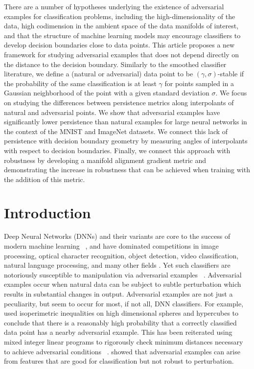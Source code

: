 
There are a number of hypotheses underlying the existence of
adversarial examples for classification problems, including the high-dimensionality of the data, high codimension in the ambient space of the data manifolds of interest, and that the structure of machine learning models may encourage classifiers to develop decision boundaries close to data points. 
This article proposes a new framework for studying adversarial examples that does not depend directly on the distance to the decision boundary. 
Similarly to the smoothed classifier literature, we define a (natural or adversarial) data point to be $(\gamma,\sigma)$-stable if the probability of the same classification is at least $\gamma$ for points sampled in a Gaussian neighborhood of the point with a given standard deviation $\sigma$. 
We focus on studying the differences between persistence metrics along interpolants of natural and adversarial points.
We show that adversarial examples have significantly lower persistence than natural examples for large neural networks in the context of the MNIST and ImageNet datasets. 
We connect this lack of persistence with decision boundary geometry by measuring angles of interpolants with respect to decision boundaries.
Finally, we connect this approach with robustness by developing a manifold alignment gradient metric and demonstrating the increase in robustness that can be achieved when training with the addition of this metric. 

\section{Introduction}

Deep Neural Networks (DNNs) and their variants are core to the success of modern machine learning ~\citep{prakash2018}, and have dominated competitions in image processing, optical character recognition, object detection, video classification, natural language processing, and many other fields \citep{SCHMIDHUBER201585}. Yet such classifiers are notoriously susceptible to manipulation via adversarial examples ~\citep{szegedy2013}. Adversarial examples occur when natural data can be subject to subtle perturbation which results in substantial changes in output. Adversarial examples are not just a peculiarity, but seem to occur for most, if not all, DNN classifiers. For example, \citet{inevitable2018} used isoperimetric inequalities on high dimensional spheres and hypercubes to conclude that there is a reasonably high probability that a correctly classified data point has a nearby adversarial example. This has been reiterated using mixed integer linear programs to rigorously check minimum distances necessary to achieve adversarial conditions ~\citep{tjeng2017evaluating}. \citet{ilyas2019adversarial} showed that adversarial examples can arise from features that are good for classification but not robust to perturbation. 

